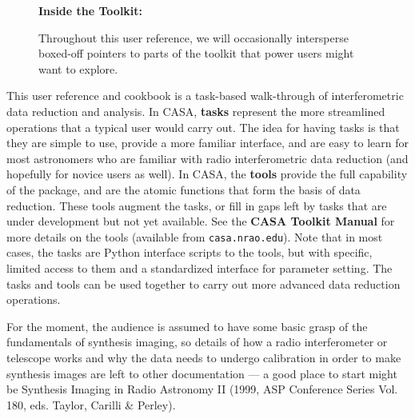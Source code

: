 \begin{wrapfigure}{r}{2.5in}
  \begin{boxedminipage}{2.5in}
     \centerline{\bf Inside the Toolkit:}
     Throughout this user reference, we will occasionally intersperse
     boxed-off pointers to parts of the toolkit that power users might
     want to explore.  
  \end{boxedminipage}
\end{wrapfigure}

This user reference and cookbook is a task-based walk-through of
interferometric data reduction and analysis. In CASA, {\bf tasks}
represent the more streamlined operations that a typical user would
carry out. The idea for having tasks is that they are simple to use,
provide a more familiar interface, and are easy to learn for most
astronomers who are familiar with radio interferometric data reduction
(and hopefully for novice users as well). In CASA, the {\bf tools}
provide the full capability of the package, and are the atomic
functions that form the basis of data reduction.  These tools augment
the tasks, or fill in gaps left by tasks that are under development
but not yet available. See the {\bf CASA Toolkit Manual} for more
details on the tools (available from \verb=casa.nrao.edu=).  Note that
in most cases, the tasks are Python interface scripts to the tools,
but with specific, limited access to them and a standardized interface
for parameter setting.  The tasks and tools can be used together to
carry out more advanced data reduction operations.

For the moment, the audience is assumed to have some basic grasp of
the fundamentals of synthesis imaging, so details of how a radio
interferometer or telescope works and why the data needs to undergo
calibration in order to make synthesis images are left to other
documentation --- a good place to start might be Synthesis Imaging in
Radio Astronomy II (1999, ASP Conference Series Vol. 180, eds. Taylor,
Carilli \& Perley).


